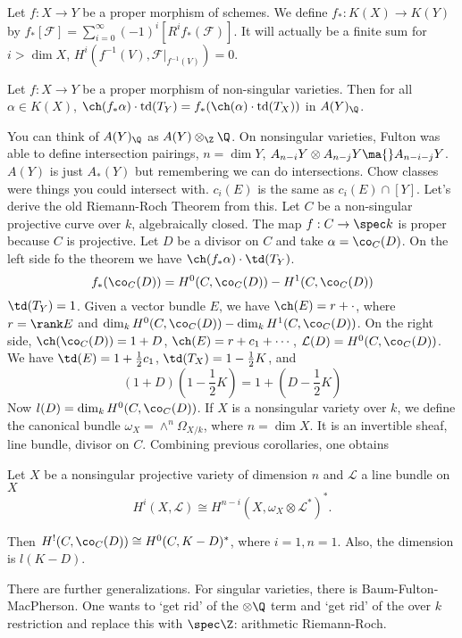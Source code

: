 Let $f: X \to Y$ be a proper morphism of schemes. We define $f_*: K(X) \to K(Y)$ by $f_*[\mathcal{F}]=\sum_{i=0}^\infty (-1)^i [R^if_*(\mathcal{F})]$. It will actually be a finite sum for $i> \dim X$, $H^i(f^{-1}(V), \mathcal{F}\big|_{f^{-1}(V)})=0$.

\begin{thmm}
Let $f: X \to Y$ be a proper morphism of non-singular varieties. Then for all $\alpha \in K(X)$, $\ch(f_*\alpha) \cdot \text{td}(T_Y)=f_*(\ch(\alpha) \cdot \text{td}(T_X))$ in $A(Y)_\Q$.
\end{thmm}


You can think of $A(Y)_\Q$ as $A(Y) \otimes_\Z \Q$. On nonsingular varieties, Fulton was able to define intersection pairings, $n=\dim Y$, $A_{n-i}Y \otimes A_{n-j} Y \ma{} A_{n-i-j}Y$. $A(Y)$ is just $A_*(Y)$ but remembering we can do intersections. Chow classes were things you could intersect with. $c_i(E)$ is the same as $c_i(E) \cap [Y]$. Let's derive the old Riemann-Roch Theorem from this. Let $C$ be a non-singular projective curve over $k$, algebraically closed. The map $f: C \to \spec k$ is proper because $C$ is projective. Let $D$ be a divisor on $C$ and take $\alpha=\co_C(D)$. On the left side fo the theorem we have $\ch(f_*\alpha) \cdot \td(T_Y)$.
	\[
	f_*(\co_C(D))=H^0(C,\co_C(D)) - H^1(C,\co_C(D))
	\]
$\td(T_Y)=1$. Given a vector bundle $E$, we have $\ch(E)=r+\cdot$, where $r=\rank E$ and $\dim_k H^0(C,\co_C(D)) - \dim_k H^1(C,\co_C(D))$. On the right side, $\ch(\co_C(D))=1+D$, $\ch(E)=r+c_1+\cdots$, $\mathcal{L}(D)=H^0(C,\co_C(D))$. We have $\td(E)=1+\frac{1}{2}c_1$, $\td(T_X)=1- \frac{1}{2}K$, and
	\[
	(1+D)(1-\frac{1}{2}K)=1+(D- \frac{1}{2} K)
	\]
Now $l(D)=\dim_k H^0(C,\co_C(D))$. If $X$ is a nonsingular variety over $k$, we define the canonical bundle $\omega_X= \wedge^n \Omega_{X/k}$, where $n=\dim X$. It is an invertible sheaf, line bundle, divisor on $C$. Combining previous corollaries, one obtains

\begin{thmm}
Let $X$ be a nonsingular projective variety of dimension $n$ and $\mathcal{L}$ a line bundle on $X$
	\[
	H^i(X,\mathcal{L}) \cong H^{n-i}(X,\omega_X\otimes \mathcal{L}^*)^*.
	\]
\end{thmm}

Then $H^!(C,\co_C(D)) \cong H^0(C,K-D)^*$, where $i=1,n=1$. Also, the dimension is $l(K-D)$. 


There are further generalizations. For singular varieties, there is Baum-Fulton-MacPherson. One wants to `get rid' of the $\otimes \Q$ term and `get rid' of the over $k$ restriction and replace this with $\spec \Z$: arithmetic Riemann-Roch. 


